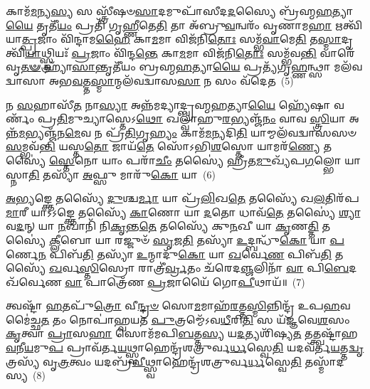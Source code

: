 𑌕𑌾𑌮᳴\-\ul{𑌮}\-𑌨𑍍𑌯\-\ul{𑌸𑍍𑌯} 𑌸 𑌸𑍍𑌤𑍍𑌰𑍀᳴𑌷𑍞\-\ul{𑌸𑌾}\-𑌦𑌮𑍁𑌪𑌾᳴𑌸𑍀𑌦\-\ul{𑌦}\-𑌸𑍍𑌯𑍈 𑌬𑍍𑌰᳴𑌹𑍍𑌮\-\ul{𑌹}\-𑌤𑍍𑌯𑌾\-\ul{𑌯𑍈} 𑌤𑍃𑌤𑍀᳴\-\ul{𑌯𑌂} 𑌪𑍍𑌰𑌤𑌿᳴ 𑌗𑍃\-\ul{𑌹𑍍𑌣𑍀}\-𑌤𑍇\-\ul{𑌤𑌿} 𑌤𑌾 𑌅᳴𑌬𑍍𑌰𑍁\-\ul{𑌵}\-𑌨𑍍𑌵𑌰𑌂᳴ 𑌵𑍃𑌣𑌾𑌮\-\ul{𑌹𑌾} 𑌋𑌤𑍍𑌵𑌿᳴𑌯𑌾\-\ul{𑌤𑍍𑌪𑍍𑌰}\-𑌜𑌾𑌂 𑌵𑌿᳴𑌨𑍍𑌦𑌾𑌮\-\ul{𑌹𑍈} 𑌕𑌾\-\ul{𑌮}\-𑌮𑌾 𑌵𑌿𑌜᳴𑌨𑌿\-\ul{𑌤𑍋𑌃} 𑌸𑌮𑍍𑌭᳴\-\ul{𑌵𑌾}\-𑌮𑍇\-\ul{𑌤𑌿} 𑌤\-\ul{𑌸𑍍𑌮𑌾}\-𑌦𑍃𑌤𑍍𑌵𑌿᳴\-\ul{𑌯𑌾}\-𑌥𑍍𑌸𑍍𑌤𑍍𑌰𑌿𑌯𑌃᳴ \ul{𑌪𑍍𑌰}\-𑌜𑌾𑌂 𑌵𑌿᳴𑌨𑍍𑌦\-\ul{𑌨𑍍𑌤𑍇} 𑌕𑌾\-\ul{𑌮}\-𑌮𑌾 𑌵𑌿𑌜᳴𑌨𑌿\-\ul{𑌤𑍋𑌃} 𑌸𑌮𑍍𑌭᳴𑌵\-\ul{𑌨𑍍𑌤𑌿} 𑌵𑌾𑌰𑍇᳴𑌵𑍃\-\ul{𑌤}\-\-\ul{𑍟} 𑌹𑍍𑌯𑌾᳴\-\ul{𑌸𑌾}\-𑌨𑍍𑌤𑍃𑌤𑍀᳴𑌯𑌂 𑌬𑍍𑌰𑌹𑍍𑌮\-\ul{𑌹}\-𑌤𑍍𑌯𑌾\-\ul{𑌯𑍈} 𑌪𑍍𑌰𑌤𑍍𑌯᳴𑌗𑍃\-\ul{𑌹𑍍𑌣}\-𑌨𑍍𑌥𑍍𑌸𑌾 𑌮𑌲᳴𑌵𑌦𑍍𑌵𑌾𑌸𑌾 𑌅𑌭\-\ul{𑌵}\-𑌤𑍍𑌤\-\ul{𑌸𑍍𑌮𑌾}\-𑌨𑍍𑌮𑌲᳴𑌵𑌦𑍍𑌵𑌾𑌸\-\ul{𑌸𑌾} 𑌨 𑌸𑌂 𑌵᳴𑌦𑍇𑌤~(5)

𑌨 \ul{𑌸}\-𑌹𑌾𑌸𑍀᳴\-\ul{𑌤} 𑌨𑌾\-\ul{𑌸𑍍𑌯𑌾} 𑌅𑌨𑍍𑌨᳴𑌮𑌦𑍍𑌯𑌾𑌦𑍍𑌬𑍍𑌰𑌹𑍍𑌮\-\ul{𑌹}\-𑌤𑍍𑌯𑌾\-\ul{𑌯𑍈} 𑌹𑍍𑌯𑍇᳴𑌷𑌾 𑌵𑌰𑍍𑌣𑌂᳴ 𑌪𑍍𑌰\-\ul{𑌤𑌿}\-𑌮𑍁𑌚𑍍𑌯𑌾𑌸𑍍𑌤𑍇\-𑌽\-\ul{𑌥𑍋} 𑌖𑌲𑍍𑌵𑌾᳴𑌹𑍁\-\ul{𑌰}\-𑌭𑍍𑌯𑌞𑍍𑌜᳴\-\ul{𑌨𑌂} 𑌵𑌾𑌵 \ul{𑌸𑍍𑌤𑍍𑌰𑌿}\-𑌯𑌾 𑌅𑌨𑍍𑌨᳴\-\ul{𑌮}\-𑌭𑍍𑌯𑌞𑍍𑌜᳴𑌨\-\ul{𑌮𑍇}\-𑌵 𑌨 𑌪𑍍𑌰᳴\-\ul{𑌤𑌿}\-𑌗𑍃\-\ul{𑌹𑍍𑌯𑌂} 𑌕𑌾𑌮᳴\-\ul{𑌮}\-𑌨𑍍𑌯𑌦𑌿\-\ul{𑌤𑌿} 𑌯𑌾𑌮𑍍𑌮𑌲᳴𑌵𑌦𑍍𑌵𑌾𑌸𑌸𑍞 \ul{𑌸}\-𑌮𑍍𑌭𑌵᳴\-\ul{𑌨𑍍𑌤𑌿} 𑌯𑌸𑍍𑌤\-\ul{𑌤𑍋} 𑌜𑌾𑌯᳴\-\ul{𑌤𑍇} 𑌸𑍋᳴\-𑌽𑌭𑌿\-\ul{𑌶}\-𑌸𑍍𑌤𑍋 𑌯𑌾𑌮𑌰᳴\-\ul{𑌣𑍍𑌯𑍇} 𑌤𑌸𑍍𑌯𑍈॑ \ul{𑌸𑍍𑌤𑍇}\-𑌨𑍋 𑌯𑌾𑌂 𑌪𑌰𑌾᳴\-\ul{𑌚𑍀𑌂} 𑌤𑌸𑍍𑌯𑍈॑ 𑌹𑍍𑌰𑍀𑌤\-\ul{𑌮𑍁}\-𑌖𑍍𑌯᳴𑌪\-\ul{𑌗}\-𑌲𑍍𑌭𑍋 𑌯𑌾 𑌸𑍍𑌨𑌾\-\ul{𑌤𑌿} 𑌤𑌸𑍍𑌯𑌾᳴ \ul{𑌅}\-𑌫𑍍𑌸𑍁 𑌮𑌾𑌰𑍁᳴\-\ul{𑌕𑍋} 𑌯𑌾~(6)

\-\ul{𑌅}\-\-\ul{𑌭𑍍𑌯}\-𑌙𑍍𑌕𑍍𑌤𑍇 𑌤𑌸𑍍𑌯𑍈᳴ \ul{𑌦𑍁}\-𑌶𑍍𑌚\-\ul{𑌰𑍍𑌮𑌾} 𑌯𑌾 𑌪𑍍𑌰᳴\-\ul{𑌲𑌿}\-𑌖\-\ul{𑌤𑍇} 𑌤𑌸𑍍𑌯𑍈᳴ 𑌖\-\ul{𑌲}\-𑌤𑌿𑌰᳴𑌪\-\ul{𑌮𑌾}\-𑌰𑍀 𑌯𑌾\-𑌽\-𑌽𑌙𑍍𑌕𑍍𑌤𑍇 𑌤𑌸𑍍𑌯𑍈᳴ \ul{𑌕𑌾}\-𑌣𑍋 𑌯𑌾 \ul{𑌦}\-𑌤𑍋 𑌧𑌾𑌵᳴\-\ul{𑌤𑍇} 𑌤𑌸𑍍𑌯𑍈॑ \ul{𑌶𑍍𑌯𑌾}\-𑌵\-\ul{𑌦}\-𑌨𑍍 𑌯𑌾 \ul{𑌨}\-𑌖𑌾𑌨𑌿᳴ 𑌨𑌿\-\ul{𑌕𑍃}\-𑌨𑍍𑌤\-\ul{𑌤𑍇} 𑌤𑌸𑍍𑌯𑍈᳴ 𑌕𑍁\-\ul{𑌨}\-𑌖𑍀 𑌯𑌾 \ul{𑌕𑍃}\-𑌣\-\ul{𑌤𑍍𑌤𑌿} 𑌤𑌸𑍍𑌯𑍈॑ \ul{𑌕𑍍𑌲𑍀}\-𑌬𑍋 𑌯𑌾 𑌰𑌜𑍍𑌜𑍁𑍞᳴ \ul{𑌸𑍃}\-𑌜\-\ul{𑌤𑌿} 𑌤𑌸𑍍𑌯𑌾᳴ \ul{𑌉}\-𑌦𑍍𑌬𑌨𑍍𑌧𑍁᳴\-\ul{𑌕𑍋} 𑌯𑌾 \ul{𑌪}\-𑌰𑍍𑌣𑍇\-\ul{𑌨} 𑌪𑌿𑌬᳴\-\ul{𑌤𑌿} 𑌤𑌸𑍍𑌯𑌾᳴ \ul{𑌉}\-𑌨𑍍𑌮𑌾𑌦𑍁᳴\-\ul{𑌕𑍋} 𑌯𑌾 \ul{𑌖}\-𑌰𑍍𑌵𑍇\-\ul{𑌣} 𑌪𑌿𑌬᳴\-\ul{𑌤𑌿} 𑌤𑌸𑍍𑌯𑍈᳴ \ul{𑌖}\-𑌰𑍍𑌵\-\ul{𑌸𑍍𑌤𑌿}\-𑌸𑍍𑌰𑍋 𑌰𑌾𑌤𑍍𑌰𑍀॑\-\ul{𑌰𑍍𑌵𑍍𑌰}\-𑌤𑌂 𑌚᳴𑌰𑍇𑌦\-\ul{𑌞𑍍𑌜}\-𑌲𑌿𑌨𑌾᳴ \ul{𑌵𑌾} 𑌪𑌿\-\ul{𑌬𑍇}\-𑌦𑌖᳴𑌰𑍍𑌵𑍇𑌣 \ul{𑌵𑌾} 𑌪𑌾𑌤𑍍𑌰𑍇᳴𑌣 \ul{𑌪𑍍𑌰}\-𑌜𑌾𑌯𑍈᳴ 𑌗𑍋\-\ul{𑌪𑍀}\-𑌥𑌾𑌯᳴॥~(7)

{\anuvakamend[{𑌯𑌥𑍍𑌸𑍋᳴\-\ul{𑌮}\-𑌪𑌾𑌨᳴𑌨𑍍𑌤𑍇 \ul{𑌵𑍃}\-𑌕𑍍𑌣𑌾𑌤𑍍𑌤\-\ul{𑌸𑍍𑌯} 𑌨𑌾𑌶𑍍𑌯𑌂᳴ 𑌵𑌦𑍇\-\ul{𑌤} 𑌮𑌾𑌰𑍁᳴\-\ul{𑌕𑍋} 𑌯𑌾\-𑌽𑌖᳴𑌰𑍍𑌵𑍇𑌣 \ul{𑌵𑌾} 𑌤𑍍𑌰𑍀𑌣𑌿᳴ 𑌚}]}%

𑌤𑍍𑌵𑌷𑍍𑌟𑌾᳴ \ul{𑌹}\-𑌤𑌪𑍁᳴\-\ul{𑌤𑍍𑌰𑍋} 𑌵𑍀\-\ul{𑌨𑍍𑌦𑍍𑌰}\-\-\ul{𑍞} 𑌸𑍋\-\ul{𑌮}\-𑌮𑌾𑌹᳴\-\ul{𑌰}\-𑌤𑍍𑌤\-\ul{𑌸𑍍𑌮𑌿}\-𑌨𑍍𑌨𑌿𑌨𑍍𑌦𑍍𑌰᳴ 𑌉𑌪\-\ul{𑌹}\-𑌵𑌮𑍈॑𑌚𑍍𑌛\-\ul{𑌤} 𑌤𑌂 𑌨𑍋𑌪𑌾॑𑌹𑍍𑌵𑌯𑌤 \ul{𑌪𑍁}\-𑌤𑍍𑌰𑌮𑍍𑌮𑍇᳴\-𑌽𑌵\-\ul{𑌧𑍀}\-𑌰𑌿\-\ul{𑌤𑌿} 𑌸 𑌯᳴𑌜𑍍𑌞𑌵𑍇\-\ul{𑌶}\-𑌸𑌂 \ul{𑌕𑍃}\-𑌤𑍍𑌵𑌾 \ul{𑌪𑍍𑌰𑌾}\-𑌸\-\ul{𑌹𑌾} 𑌸𑍋𑌮᳴𑌮𑌪𑌿\-\ul{𑌬}\-𑌤𑍍𑌤\-\ul{𑌸𑍍𑌯} 𑌯\-\ul{𑌦}\-𑌤𑍍𑌯𑌶𑌿᳴𑌷𑍍𑌯\-\ul{𑌤} 𑌤𑌤𑍍𑌤𑍍𑌵𑌷𑍍𑌟𑌾᳴𑌹\-\ul{𑌵}\-𑌨𑍀\-\ul{𑌯}\-𑌮𑍁\-\ul{𑌪} 𑌪𑍍𑌰𑌾𑌵᳴𑌰𑍍𑌤\-\ul{𑌯}\-𑌥𑍍𑌸𑍍𑌵𑌾𑌹𑍇𑌨𑍍𑌦𑍍𑌰᳴𑌶𑌤𑍍𑌰𑍁𑌰𑍍𑌵\-\ul{𑌰𑍍𑌧}\-𑌸𑍍𑌵𑍇\-\ul{𑌤𑌿} 𑌯𑌦𑌵᳴𑌰𑍍𑌤\-\ul{𑌯}\-𑌤𑍍𑌤\-\ul{𑌦𑍍𑌵𑍃}\-𑌤𑍍𑌰𑌸𑍍𑌯᳴ 𑌵𑍃\-\ul{𑌤𑍍𑌰}\-𑌤𑍍𑌵𑌂 𑌯𑌦𑌬𑍍𑌰᳴\-\ul{𑌵𑍀}\-𑌥𑍍𑌸𑍍𑌵𑌾𑌹𑍇𑌨𑍍𑌦𑍍𑌰᳴𑌶𑌤𑍍𑌰𑍁𑌰𑍍𑌵\-\ul{𑌰𑍍𑌧}\-𑌸𑍍𑌵𑍇\-\ul{𑌤𑌿} 𑌤𑌸𑍍𑌮𑌾᳴𑌦𑌸𑍍𑌯~(8)

